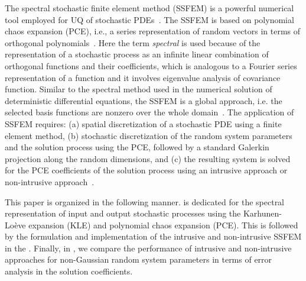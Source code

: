 \documentclass[letter,1p,11pt,oneside,onecolumn,sort&compress]{elsarticle}
\begin{document}
The spectral stochastic finite element method (SSFEM) is a powerful numerical tool employed for UQ of stochastic PDEs~\cite{ghanemSFEM1991,le2010spectral}.
The SSFEM is based on polynomial chaos expansion (PCE), i.e., a series representation of random vectors in terms of orthogonal polynomials~\cite{ghanemSFEM1991,le2010spectral,smith2013uncertainty}.
Here the term {\it{spectral}} is used because of the representation of a stochastic process as an infinite linear combination of orthogonal functions and their coefficients, which is analogous to a Fourier series representation of a function and it involves eigenvalue analysis of covariance function. Similar to the spectral method used in the numerical solution of deterministic differential equations\cite{canuto2012spectral}, the SSFEM is a global approach, i.e. the selected basis functions are nonzero over the whole domain~\cite{ghanemSFEM1991}.
The application of SSFEM requires:
(a) spatial discretization of a stochastic PDE using a finite element method, (b) stochastic discretization of the random system parameters and the solution process using the PCE, followed by a standard Galerkin projection along the random dimensions, and (c) the resulting system is solved for the PCE coefficients of the solution process using an intrusive approach or non-intrusive approach~\cite{ghanemSFEM1991,le2010spectral,ghanem1996numerical,ghanem1999ingredients}.

This paper is organized in the following manner.  is dedicated for the spectral representation of input and output stochastic processes using the Karhunen-Lo{\`e}ve expansion (KLE) and polynomial chaos expansion (PCE). This is followed by the formulation and implementation of the intrusive and non-intrusive SSFEM in the . Finally, in , we compare the performance of intrusive and non-intrusive approaches for non-Gaussian random system parameters in terms of
error analysis in the solution coefficients.
\end{document}
